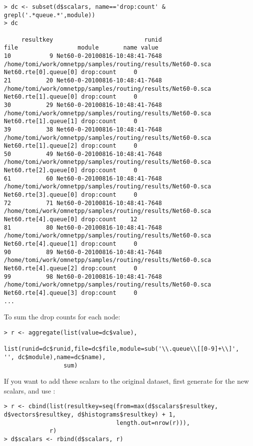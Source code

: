 \begin{verbatim}
> dc <- subset(d$scalars, name=='drop:count' & grepl('.*queue.*',module))
> dc

     resultkey                          runid                                                        file                 module       name value
10           9 Net60-0-20100816-10:48:41-7648 /home/tomi/work/omnetpp/samples/routing/results/Net60-0.sca  Net60.rte[0].queue[0] drop:count     0
21          20 Net60-0-20100816-10:48:41-7648 /home/tomi/work/omnetpp/samples/routing/results/Net60-0.sca  Net60.rte[1].queue[0] drop:count     0
30          29 Net60-0-20100816-10:48:41-7648 /home/tomi/work/omnetpp/samples/routing/results/Net60-0.sca  Net60.rte[1].queue[1] drop:count     0
39          38 Net60-0-20100816-10:48:41-7648 /home/tomi/work/omnetpp/samples/routing/results/Net60-0.sca  Net60.rte[1].queue[2] drop:count     0
50          49 Net60-0-20100816-10:48:41-7648 /home/tomi/work/omnetpp/samples/routing/results/Net60-0.sca  Net60.rte[2].queue[0] drop:count     0
61          60 Net60-0-20100816-10:48:41-7648 /home/tomi/work/omnetpp/samples/routing/results/Net60-0.sca  Net60.rte[3].queue[0] drop:count     0
72          71 Net60-0-20100816-10:48:41-7648 /home/tomi/work/omnetpp/samples/routing/results/Net60-0.sca  Net60.rte[4].queue[0] drop:count    12
81          80 Net60-0-20100816-10:48:41-7648 /home/tomi/work/omnetpp/samples/routing/results/Net60-0.sca  Net60.rte[4].queue[1] drop:count     0
90          89 Net60-0-20100816-10:48:41-7648 /home/tomi/work/omnetpp/samples/routing/results/Net60-0.sca  Net60.rte[4].queue[2] drop:count     0
99          98 Net60-0-20100816-10:48:41-7648 /home/tomi/work/omnetpp/samples/routing/results/Net60-0.sca  Net60.rte[4].queue[3] drop:count     0
...
\end{verbatim}

To sum the drop counts for each node:

\begin{verbatim}
> r <- aggregate(list(value=dc$value),
                 list(runid=dc$runid,file=dc$file,module=sub('\\.queue\\[[0-9]+\\]', '', dc$module),name=dc$name),
                 sum)
\end{verbatim}

If you want to add these scalars to the original dataset, first generate  for the new scalars,
and use :

\begin{verbatim}
> r <- cbind(list(resultkey=seq(from=max(d$scalars$resultkey, d$vectors$resultkey, d$histograms$resultkey) + 1,
                                length.out=nrow(r))),
             r)
> d$scalars <- rbind(d$scalars, r)
\end{verbatim}

